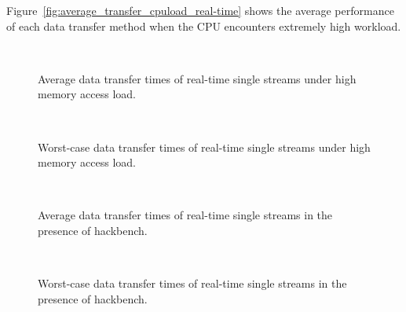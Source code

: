 Figure~\ref{fig:average_transfer_cpuload_real-time} shows the average
performance of each data transfer method when the CPU encounters
extremely high workload.

\begin{figure}[!t]
 \centering
 \\
 \caption{Average data transfer times of real-time single streams
 under high memory access load.}
 \label{fig:average_data_transfer_memswap_real-time}
\end{figure}

\begin{figure}[!t]
 \centering
 \\
 \caption{Worst-case data transfer times of real-time single streams
 under high memory access load.}
 \label{fig:worst_case_data_transfer_memswap_real-time}
\end{figure}

\begin{figure}[!t]
 \centering
 \\
 \caption{Average data transfer times of real-time single streams in the
 presence of \textsf{hackbench}.}
 \label{fig:average_data_transfer_hackbench_real-time}
\end{figure}

\begin{figure}[!t]
 \centering
 \\
 \caption{Worst-case data transfer times of real-time single streams in
 the presence of \textsf{hackbench}.}
 \label{fig:worst_case_data_transfer_hackbench_real-time}
\end{figure}

